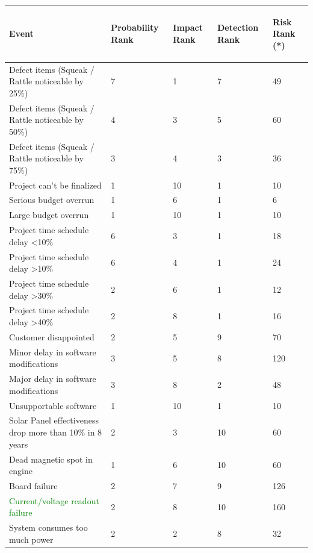 \documentclass[12pt,a4paper]{report}
\begin{document}
\begin{tabular}{|p{10cm}|p{1cm}|p{1cm}|p{1cm}|p{1cm}|}
\hline Event  & \begin{sideways}Probability Rank\end{sideways} & \begin{sideways}Impact Rank\end{sideways} & \begin{sideways}Detection Rank\end{sideways} & \begin{sideways}Risk Rank (*)\end{sideways} \\ 
\hline Defect items (Squeak / Rattle noticeable by 25\%) & 7 & 1 & 7 & 49 \\ 
\hline Defect items (Squeak / Rattle noticeable by 50\%) & 4 & 3 & 5 & 60 \\ 
\hline Defect items (Squeak / Rattle noticeable by 75\%) & 3 & 4 & 3 & 36 \\ 
\hline Project can’t be finalized & 1 & 10 & 1 & 10 \\ 
\hline Serious budget overrun & 1 & 6 & 1 & 6 \\ 
\hline Large budget overrun & 1 & 10 & 1 & 10 \\ 
\hline Project time schedule delay \textless 10\% & 6 & 3 & 1 & 18 \\ 
\hline Project time schedule delay \textgreater 10\% & 6 & 4 & 1 & 24 \\ 
\hline Project time schedule delay \textgreater 30\% & 2 & 6 & 1 & 12 \\ 
\hline Project time schedule delay \textgreater 40\% & 2 & 8 & 1 & 16 \\ 
\hline Customer disappointed & 2 & 5 & 9 & 70 \\ 
\hline Minor delay in software modifications & 3 & 5 & 8 & 120 \\ 
\hline Major delay in software modifications & 3 & 8 & 2 & 48 \\ 
\hline Unsupportable software & 1 & 10 & 1 & 10 \\ 
\hline Solar Panel effectiveness drop more than 10\% in 8 years & 2 & 3 & 10 & 60 \\
\hline Dead magnetic spot in engine & 1 & 6 & 10 & 60 \\ 
\hline Board failure & 2 & 7 & 9 & 126 \\ 
\hline \textcolor{green} {Current/voltage readout failure} & 2 & 8 & 10 & 160 \\ 
\hline System consumes too much power & 2 &  2 & 8 & 32 \\ 

\end{tabular}
\end{document}
